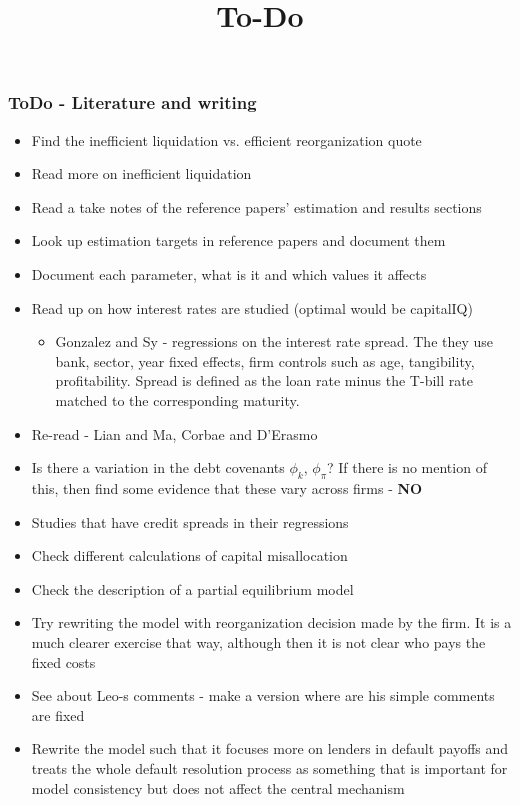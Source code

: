 \documentclass[12pt]{article}
\title{To-Do}
\date{}
\begin{document}
\subsubsection*{ToDo - Literature and writing}
\begin{itemize}\setlength\itemsep{0em} \small
    \item Find the inefficient liquidation vs. efficient reorganization quote \checkmark 
    \item Read more on inefficient liquidation \checkmark
    \item Read a take notes of the reference papers' estimation and results sections \checkmark
    \item Look up estimation targets in reference papers and document them \checkmark
    \item Document each parameter, what is it and which values it affects \checkmark
    \item Read up on how interest rates are studied (optimal would be capitalIQ) \checkmark
    \begin{itemize}
        \item Gonzalez and Sy - regressions on the interest rate spread. The they use bank, sector, year fixed effects, firm controls such as age, tangibility, profitability. Spread is defined as the loan rate minus the T-bill rate matched to the corresponding maturity. 
    \end{itemize}
    \item Re-read - Lian and Ma, Corbae and D'Erasmo \checkmark
    \item Is there a variation in the debt covenants $\phi_k$, $\phi_\pi$? If there is no mention of this, then find some evidence that these vary across firms - \textbf{NO} \checkmark 
    \item Studies that have credit spreads in their regressions \checkmark
    \item Check different calculations of capital misallocation \checkmark
    \item Check the description of a partial equilibrium model  \checkmark
    \item Try rewriting the model with reorganization decision made by the firm. It is a much clearer exercise that way, although then it is not clear who pays the fixed costs \checkmark
    \item See about Leo-s comments - make a version where are his simple comments are fixed \checkmark
    \item Rewrite the model such that it focuses more on lenders in default payoffs and treats the whole default resolution process as something that is important for model consistency but does not affect the central mechanism  \checkmark

\end{itemize}
\end{document}
